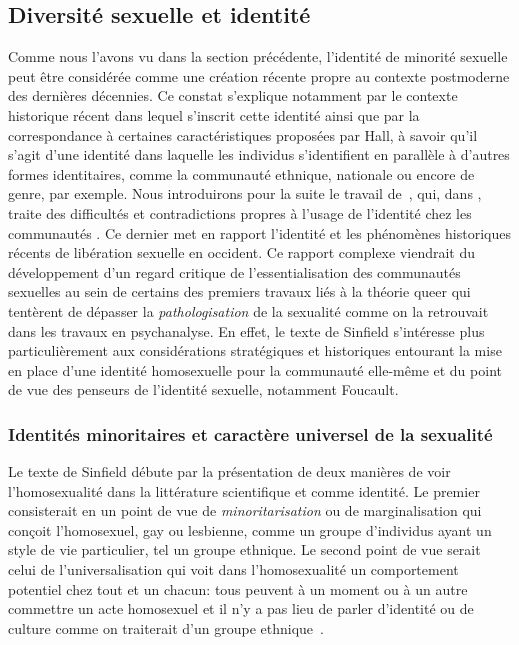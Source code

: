 \subsection{Diversité sexuelle et identité}
\label{sec:diversit_sexuelle_et_identit_} Comme nous l'avons vu dans la section précédente, l'identité de minorité sexuelle peut être considérée comme une création récente propre au contexte postmoderne des dernières décennies. 
Ce constat s'explique notamment par le contexte historique récent dans lequel s'inscrit cette identité ainsi que par la correspondance à certaines caractéristiques proposées par Hall, à savoir qu'il s'agit d'une identité dans laquelle les individus s'identifient en parallèle à d'autres formes identitaires, comme la communauté ethnique, nationale ou encore de genre, par exemple.
Nous introduirons pour la suite le travail de~\citet{Sinfield1996}, qui, dans , traite des difficultés et contradictions propres à l'usage de l'identité chez les communautés \lgbt{}.
Ce dernier met en rapport l'identité et les phénomènes historiques récents de libération sexuelle en occident.
Ce rapport complexe viendrait du développement d'un regard critique de l'essentialisation des communautés sexuelles au sein de certains des premiers travaux liés à la théorie queer qui tentèrent de dépasser la \emph{pathologisation} de la sexualité comme on la retrouvait dans les travaux en psychanalyse. 
En effet, le texte de Sinfield s'intéresse plus particulièrement aux considérations stratégiques et historiques entourant la mise en place d'une identité homosexuelle pour la communauté elle-même et du point de vue des penseurs de l'identité sexuelle, notamment Foucault.

\subsubsection{Identités minoritaires et caractère universel de la sexualité}
\label{sub:minorit_s_et_universel}
Le texte de Sinfield débute par la présentation de deux manières de voir l'homosexualité dans la littérature scientifique et comme identité.
Le premier consisterait en un point de vue de \emph{minoritarisation} ou de marginalisation qui conçoit l'homosexuel, gay ou lesbienne, comme un groupe d'individus ayant un style de vie particulier, tel un groupe ethnique.
Le second point de vue serait celui de l'universalisation qui voit dans l'homosexualité un comportement potentiel chez tout et un chacun: tous peuvent à un moment ou à un autre commettre un acte homosexuel et il n'y a pas lieu de parler d'identité ou de culture comme on traiterait d'un groupe ethnique~\citep[271]{Sinfield1996}.

